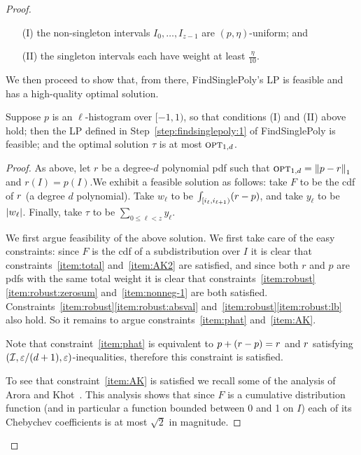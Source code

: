 \begin{proof}
\begin{enumerate}
\item [(I)] the non-singleton intervals $I_0,\dots,I_{z-1}$ are $(p,\eta)$-uniform; and
\item [(II)] the singleton intervals each have weight at least $\frac{\eta}{10}$.
\end{enumerate}

We then proceed to show that, from there, {\sc FindSinglePoly}'s LP is feasible and has a high-quality
optimal solution.

\begin{lemma} \label{lem:feasible}
Suppose $p$ is an $\ell$-histogram over $[-1,1)$, so that conditions (I) and (II) above hold;
then the LP defined in Step~\ref{step:findsinglepoly:1} of {\sc FindSinglePoly}
is feasible; and the optimal solution $\tau$ is at most ${\textsc{opt}}_{1,d}$.
\end{lemma}

\begin{proof}
As above, let $r$ be a degree-$d$ polynomial pdf such that ${\textsc{opt}}_{1,d}=
{\lVert p-r{\rVert}}_1$ {and $r(I) = p(I)$}.We exhibit a feasible solution as follows:
take $F$ to be the cdf of {${r}$} (a degree $d$ polynomial).
Take $w_\ell$ to be $\int_{[i_\ell,i_{\ell+1})} ({{r}-{p}})$,
and take $y_\ell$ to be $\left\lvert w_\ell \right\rvert$.
Finally, take $\tau$ to be $\sum_{0 \leq \ell < {z}} y_\ell.$

We first argue feasibility of the above solution.  
We first take care of the easy constraints:
since $F$ is the cdf of a {sub}distribution over $I$ it is clear that
constraints~\ref{item:total} and~\ref{item:AK2} are satisfied,
and since both $r$ and $p$ are pdfs {with the same total weight} it is clear
that constraints~\ref{item:robust}\eqref{item:robust:zerosum} and~\ref{item:nonneg-1} are both satisfied. 
Constraints~\ref{item:robust}\eqref{item:robust:absval} and~\ref{item:robust}\eqref{item:robust:lb} also hold.  
So it remains to argue constraints~\ref{item:phat} and~\ref{item:AK}.

Note that constraint~\ref{item:phat} is equivalent to $p + ({r} - p) = {r}$ 
and ${r}$ satisfying $(\mathcal{I}, \varepsilon/(d+1), \varepsilon)$-inequalities, 
therefore this constraint is satisfied.

To see that constraint~\ref{item:AK} is satisfied we recall some of the analysis
of Arora and Khot~\cite[{Section~3}]{AK:03}.  This analysis shows that since
$F$ is a cumulative distribution function (and in particular a function bounded between 0 and 1 on $I$) each of its
Chebychev coefficients is at most $\sqrt{2}$ in magnitude.


\end{proof}
\end{proof}

